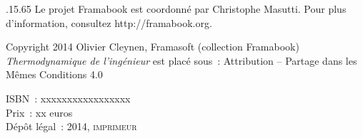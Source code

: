 \begin{titlepage}
{}

{ .15\hsize.65\hsize
	Le projet Framabook est coordonné par Christophe Masutti. Pour plus d’information, consultez http://framabook.org.

}

\begin{center}
		\noindent Copyright 2014 Olivier Cleynen, Framasoft (collection Framabook)\\
		\textit{Thermodynamique de l’ingénieur} est placé sous~: Attribution -- Partage dans les Mêmes Conditions 4.0

		\noindent ISBN~: xxxxxxxxxxxxxxxxx \\
		Prix~: xx euros \\
		Dépôt légal~: 2014, \textsc{imprimeur}
\end{center}


\end{titlepage}
\restoregeometry
